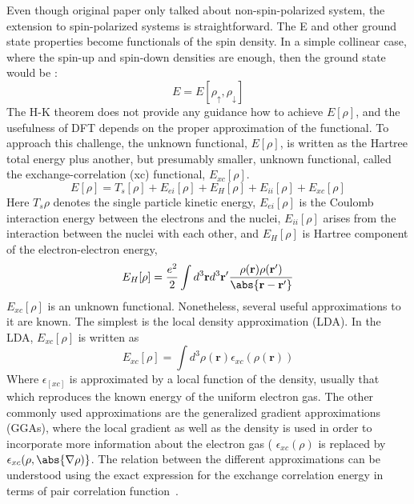 Even though original paper only talked about non-spin-polarized system, the extension to spin-polarized systems is straightforward. The E and other ground state properties become functionals of the spin density. In a simple collinear case, where the spin-up and spin-down densities are enough, then the ground state would be :
\begin{equation}
	E =E[\rho_{\uparrow},\rho_{\downarrow}]
\end{equation} 
The H-K theorem does not provide any guidance how to achieve $E[\rho]$, and the usefulness of DFT depends on the proper approximation of the functional. To approach this challenge, the unknown functional, $E[\rho]$, is written as the Hartree total energy plus another, but presumably smaller, unknown functional, called the exchange-correlation (xc) functional, $E_{xc}[\rho]$.
\begin{equation}
\label{eq_main_func}
E[\rho] = T_s[\rho] + E_{ei} [\rho] + E_H[\rho] + E_{ii}[\rho] + E_{xc}[\rho]
\end{equation}
Here $T_s{\rho}$ denotes the single particle kinetic energy, $E_{ei}[\rho]$ is the Coulomb interaction energy between the electrons and the nuclei, $E_{ii}[\rho]$ arises from the interaction between the nuclei with each other, and $E_H[\rho]$ is Hartree component of the electron-electron energy,
\begin{equation}
\label{eq_hartree}
E_H[\rho] = \frac{e^2}{2}\int d^3\mathbf{r}d^3\mathbf{r'} \frac{\rho(\mathbf{r})\rho(\mathbf{r'})}{\abs{\mathbf{r}-\mathbf{r'}}}
\end{equation}
$E_{xc}[\rho]$ is an unknown functional. Nonetheless, several useful approximations to it are known. The simplest is the local density approximation (LDA). In the LDA, $E_{xc}[\rho]$ is written as
\begin{equation}
E_{xc}[\rho] = \int d^3\rho(\mathbf{r})\epsilon_{xc}(\rho(\mathbf{r}))
\end{equation}
Where $\epsilon_[xc]$ is approximated by a local function of the density, usually that which reproduces the known energy of the uniform electron gas. The other commonly used approximations are the generalized gradient approximations (GGAs), where the local gradient as well as the density is used in order to incorporate more information about the electron gas ( $\epsilon_{xc} (\rho)$ is replaced by $\epsilon_{xc}(\rho,\abs{\nabla\rho)}$. The relation between the different approximations can be understood using the exact expression for the exchange correlation energy in terms of pair correlation function~\cite{langreth1975exchange}.

